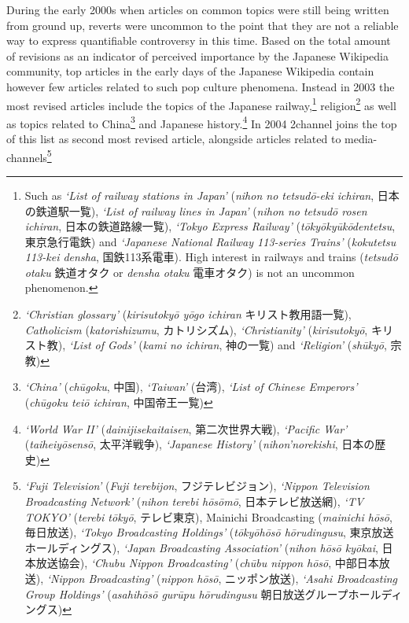 \documentclass[10pt,british,A4paper,,openany]{memoir}
\begin{document}
During the early 2000s when articles on common topics were still being
written from ground up, reverts were uncommon to the point that they are
not a reliable way to express quantifiable controversy in this time.
Based on the total amount of revisions as an indicator of perceived
importance by the Japanese Wikipedia community, top articles in the
early days of the Japanese Wikipedia contain however few articles
related to such pop culture phenomena. Instead in 2003 the most revised
articles include the topics of the Japanese railway,\footnote{Such as
  \emph{`List of railway stations in Japan'} (\emph{nihon no tetsudō-eki
  ichiran}, 日本の鉄道駅一覧), \emph{`List of railway lines in Japan'}
  (\emph{nihon no tetsudō rosen ichiran}, 日本の鉄道路線一覧),
  \emph{`Tokyo Express Railway'} (\emph{tōkyōkyūkōdentetsu},
  東京急行電鉄) and \emph{`Japanese National Railway 113-series Trains'}
  (\emph{kokutetsu 113-kei densha}, 国鉄113系電車). High interest in
  railways and trains (\emph{tetsudō otaku} 鉄道オタク or \emph{densha
  otaku} 電車オタク) is not an uncommon phenomenon.} religion\footnote{\emph{`Christian
  glossary'} (\emph{kirisutokyō yōgo ichiran} キリスト教用語一覧),
  \emph{Catholicism} (\emph{katorishizumu}, カトリシズム),
  \emph{`Christianity'} (\emph{kirisutokyō}, キリスト教), \emph{`List of
  Gods'} (\emph{kami no ichiran}, 神の一覧) and \emph{`Religion'}
  (\emph{shūkyō}, 宗教)} as well as topics related to China\footnote{\emph{`China'}
  (\emph{chūgoku}, 中国), \emph{`Taiwan'} (台湾), \emph{`List of Chinese
  Emperors' } (\emph{chūgoku teiō ichiran}, 中国帝王一覧)} and Japanese
history.\footnote{\emph{`World War II'} (\emph{dainijisekaitaisen},
  第二次世界大戦), \emph{`Pacific War'} (\emph{taiheiyōsensō},
  太平洋戦争), \emph{`Japanese History'} (\emph{nihon'norekishi},
  日本の歴史)} In 2004 2channel joins the top of this list as second
most revised article, alongside articles related to
media-channels\footnote{\emph{`Fuji Television'} (\emph{Fuji terebijon},
  フジテレビジョン), \emph{`Nippon Television Broadcasting Network'}
  (\emph{nihon terebi hōsōmō}, 日本テレビ放送網), \emph{`TV TOKYO'}
  (\emph{terebi tōkyō}, テレビ東京), Mainichi Broadcasting
  (\emph{mainichi hōsō}, 毎日放送), \emph{`Tokyo Broadcasting Holdings'}
  (\emph{tōkyōhōsō hōrudingusu}, 東京放送ホールディングス), \emph{`Japan
  Broadcasting Association'} (\emph{nihon hōsō kyōkai}, 日本放送協会),
  \emph{`Chubu Nippon Broadcasting'} (\emph{chūbu nippon hōsō},
  中部日本放送), \emph{`Nippon Broadcasting'} (\emph{nippon hōsō},
  ニッポン放送), \emph{`Asahi Broadcasting Group Holdings'}
  (\emph{asahihōsō gurūpu hōrudingusu} 朝日放送グループホールディングス)}
\end{document}
